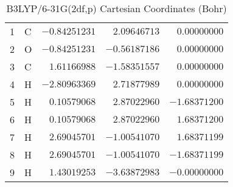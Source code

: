 \documentclass[10pt,oneside]{article}
\begin{document}
\begin{table}[h]
\centering
\caption{B3LYP/6-31G(2df,p) Cartesian Coordinates (Bohr)}
\begin{tabular}{llrrr}
\toprule
1  & C  & $-0.84251231$ & $ 2.09646713$ & $ 0.00000000$ \\
2  & O  & $-0.84251231$ & $-0.56187186$ & $ 0.00000000$ \\
3  & C  & $ 1.61166988$ & $-1.58351557$ & $ 0.00000000$ \\
4  & H  & $-2.80963369$ & $ 2.71877989$ & $ 0.00000000$ \\
5  & H  & $ 0.10579068$ & $ 2.87022960$ & $-1.68371200$ \\
6  & H  & $ 0.10579068$ & $ 2.87022960$ & $ 1.68371200$ \\
7  & H  & $ 2.69045701$ & $-1.00541070$ & $ 1.68371199$ \\
8  & H  & $ 2.69045701$ & $-1.00541070$ & $-1.68371199$ \\
9  & H  & $ 1.43019253$ & $-3.63872983$ & $-0.00000000$ \\
\bottomrule
\end{tabular}
\end{table}
\end{document}
